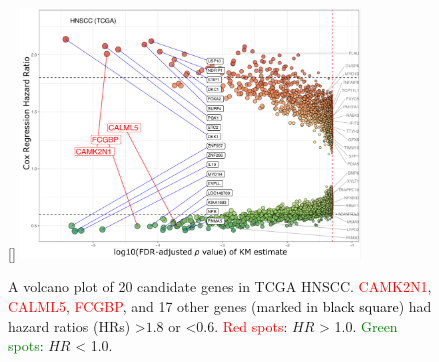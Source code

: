 \documentclass[
paper=landscape,
paper=160mm:90mm, %
fontsize=11pt, %
pagesize, %
parskip=half-, %
]{scrartcl} %
\theoremstyle{mythmstyle} %
\begin{document}

\clearpage
\begin{figure}[ht]

[\FBwidth]
{    \includegraphics[width=9cm]{Rplot_TCGA_HNSCC_CoxHR_CAMK2N1_top3FDRKM.pdf}}
{    \caption{A volcano plot of 20 candidate genes in TCGA HNSCC.
    \textcolor{red}{CAMK2N1}, \textcolor{red}{CALML5}, \textcolor{red}{FCGBP}, and 17 other genes (marked in \textcolor{black}{black square}) had hazard ratios (HRs) >$1.8$ or <$0.6$.
    \textcolor{red}{Red spots}: $HR$ > 1.0.
    \textcolor{green}{Green spots}: $HR$ < 1.0.
    }}
\end{figure}
\end{document}
